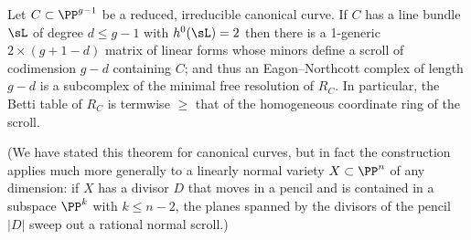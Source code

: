 %
%
%
\begin{theorem}
Let $C\subset \PP^{g-1}$ be a reduced, irreducible canonical curve. If
$C$ has a line bundle $\sL$ of degree $d \leq g-1$ with $h^0(\sL) =
2$  then
there is a 1-generic  $2\times (g+1-d)$ matrix of linear forms whose
minors define a scroll of codimension $g-d$ containing $C$; and thus an
Eagon--Northcott complex of length $g-d$ is a subcomplex of the minimal
free resolution of $R_C$. In particular, the Betti table of $R_C$ is
%
termwise $\geq$ that of the homogeneous coordinate ring of the scroll.
\unif
\end{theorem}

(We have stated this theorem for canonical curves, but in fact the
construction applies much more generally to a linearly normal variety
$X \subset \PP^n$ of any dimension: if $X$ has a divisor $D$ that moves
in a pencil and is contained in a subspace $\PP^k$ with $k \leq n-2$,
the planes spanned by the divisors of the pencil $|D|$ sweep out a
rational normal scroll.)

